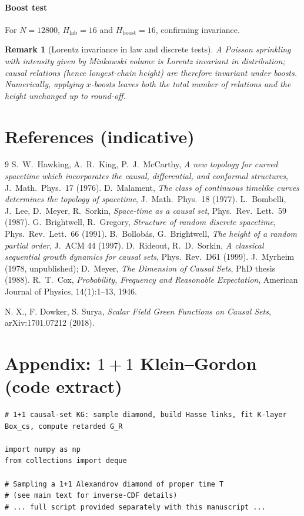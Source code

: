 \documentclass[12pt,a4paper]{article}
\newtheorem{remark}{Remark}
\begin{document}
\paragraph{Boost test} For $N=12800$, $H_{\text{lab}}=16$ and $H_{\text{boost}}=16$, confirming invariance.

\begin{remark}[Lorentz invariance in law and discrete tests]\label{rem:boosts}
A Poisson sprinkling with intensity given by Minkowski volume is Lorentz invariant in distribution; causal relations (hence longest-chain height) are therefore invariant under boosts. Numerically, applying $x$-boosts leaves both the total number of relations and the height unchanged up to round-off.
\end{remark}

\section{References (indicative)}
\begin{thebibliography}{9}
 S.\ W.\ Hawking, A.\ R.\ King, P.\ J.\ McCarthy, \emph{A new topology for curved spacetime which incorporates the causal, differential, and conformal structures}, J.\ Math.\ Phys.\ 17 (1976).
 D.\ Malament, \emph{The class of continuous timelike curves determines the topology of spacetime}, J.\ Math.\ Phys.\ 18 (1977).
 L.\ Bombelli, J.\ Lee, D.\ Meyer, R.\ Sorkin, \emph{Space-time as a causal set}, Phys.\ Rev.\ Lett.\ 59 (1987).
 G.\ Brightwell, R.\ Gregory, \emph{Structure of random discrete spacetime}, Phys.\ Rev.\ Lett.\ 66 (1991).
 B.\ Bollob\'as, G.\ Brightwell, \emph{The height of a random partial order}, J.\ ACM 44 (1997).
 D.\ Rideout, R.\ D.\ Sorkin, \emph{A classical sequential growth dynamics for causal sets}, Phys.\ Rev.\ D61 (1999).
 J.\ Myrheim (1978, unpublished); D.\ Meyer, \emph{The Dimension of Causal Sets}, PhD thesis (1988).
 R.~T.~Cox, \emph{Probability, Frequency and Reasonable Expectation}, American Journal of Physics, 14(1):1--13, 1946.

 N. X., F. Dowker, S. Surya, \emph{Scalar Field Green Functions on Causal Sets}, arXiv:1701.07212 (2018).
\end{thebibliography}



\section{Appendix: $1{+}1$ Klein--Gordon (code extract)}\label{app:kg_code}
\begin{verbatim}
# 1+1 causal-set KG: sample diamond, build Hasse links, fit K-layer Box_cs, compute retarded G_R

import numpy as np
from collections import deque

# Sampling a 1+1 Alexandrov diamond of proper time T
# (see main text for inverse-CDF details)
# ... full script provided separately with this manuscript ...
\end{verbatim}
\end{document}
